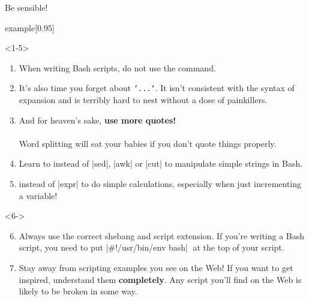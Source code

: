 \begin{frame}{Be sensible!}
    \begin{varblock}{example}[0.95\textwidth]{}
        \large {}
    \end{varblock}
    \medskip
    \parbox[c][0.7\textheight][t]{\textwidth}{
        \begin{onlyenv}<1-5>
            \begin{enumerate}[<+->]
                \item When writing Bash scripts, \alert{do not use the \bash{[} command.}\\
                       \bash{[[}
                \item It's also time \alert{you forget about \texttt{`...`}}.
                      It isn't consistent with the syntax of expansion and is terribly hard to nest without a dose of painkillers.
                \item And for heaven's sake, \textbf{use more quotes!}\\
                      \\
                      Word splitting will eat your babies if you don't quote things properly.
                \item Learn to  instead of \bash|sed|, \bash|awk| or \bash|cut| to manipulate simple strings in Bash.
                \item {} instead of \bash|expr| to do simple calculations, especially when just incrementing a variable!
            \end{enumerate}
        \end{onlyenv}
        \begin{onlyenv}<6->
            \begin{enumerate}[<+->]
                \setcounter{enumi}{5}
                \item Always use the correct shebang and script extension.
                      If you're writing a Bash script, you need to put \bash|\#!/usr/bin/env bash|$\;$ at the top of your script.
                \item Stay away from scripting examples you see on the Web!
                      If you want to get inspired, understand them \textbf{completely}.
                      Any script you'll find on the Web is likely to be broken in some way.

\end{enumerate}
\end{onlyenv}}
\end{frame}
